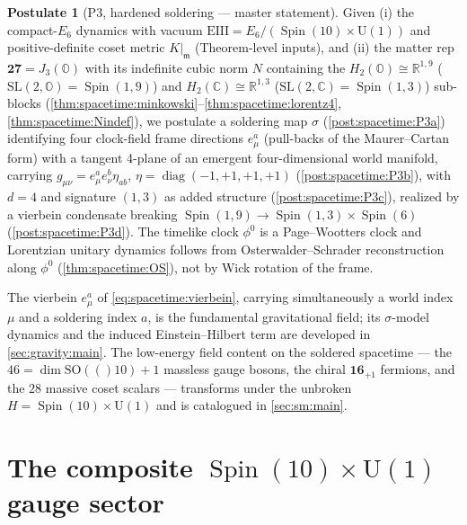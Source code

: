 \documentclass[11pt]{article}
\theoremstyle{plain}
\theoremstyle{definition}
\newtheorem{postulate}[theorem]{Postulate}
\theoremstyle{remark}
\newcommand{\SO}[1]{\mathrm{SO}(#1)}
\newcommand{\U}[1]{\mathrm{U}(#1)}
\newcommand{\SL}{\mathrm{SL}}
\newcommand{\Spin}{\operatorname{Spin}}
\newcommand{\diag}{\operatorname{diag}}
\newcommand{\Uone}{\U{1}}
\newcommand{\EIII}{\mathrm{EIII}}
\begin{document}
\begin{postulate}[P3, hardened soldering --- master statement]\label{post:spacetime:P3master}
Given (i) the compact-$E_6$ dynamics with vacuum $\EIII=E_6/(\Spin(10)\times\Uone)$ and
positive-definite coset metric $K|_{\mathfrak m}$ (Theorem-level inputs), and (ii) the
matter rep $\mathbf{27}=J_3(\mathbb O)$ with its indefinite cubic norm $N$ containing the
$H_2(\mathbb O)\cong\mathbb R^{1,9}$ ($\SL(2,\mathbb O)=\Spin(1,9)$) and
$H_2(\mathbb C)\cong\mathbb R^{1,3}$ ($\SL(2,\mathbb C)=\Spin(1,3)$) sub-blocks
(\autoref{thm:spacetime:minkowski}--\autoref{thm:spacetime:lorentz4},
\autoref{thm:spacetime:Nindef}), we postulate a soldering map $\sigma$
(\autoref{post:spacetime:P3a}) identifying four clock-field frame directions $e^a_\mu$
(pull-backs of the Maurer--Cartan form) with a tangent 4-plane of an emergent
four-dimensional world manifold, carrying $g_{\mu\nu}=e^a_\mu e^b_\nu\eta_{ab}$,
$\eta=\diag(-1,+1,+1,+1)$ (\autoref{post:spacetime:P3b}), with $d=4$ and signature
$(1,3)$ as added structure (\autoref{post:spacetime:P3c}), realized by a vierbein
condensate breaking $\Spin(1,9)\to\Spin(1,3)\times\Spin(6)$
(\autoref{post:spacetime:P3d}). The timelike clock $\phi^0$ is a Page--Wootters clock
and Lorentzian unitary dynamics follows from Osterwalder--Schrader reconstruction along
$\phi^0$ (\autoref{thm:spacetime:OS}), not by Wick rotation of the frame.
\end{postulate}

The vierbein $e^a_\mu$ of \eqref{eq:spacetime:vierbein}, carrying simultaneously a
world index $\mu$ and a soldering index $a$, is the fundamental gravitational field; its
$\sigma$-model dynamics and the induced Einstein--Hilbert term are developed in
\autoref{sec:gravity:main}. The low-energy field content on the soldered spacetime ---
the $46=\dim\SO(10)+1$ massless gauge bosons, the chiral $\mathbf{16}_{+1}$ fermions,
and the $28$ massive coset scalars --- transforms under the unbroken
$H=\Spin(10)\times\Uone$ and is catalogued in \autoref{sec:sm:main}.
\section{The composite \texorpdfstring{$\Spin(10)\times\Uone$}{Spin(10) x U(1)} gauge sector}
\label{sec:gauge:main}
\end{document}
